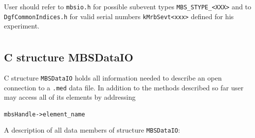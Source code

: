 \documentclass[10pt,a4paper]{article}
\newenvironment{blueboxed}
	{\begin{Sbox}\begin{minipage}[t]}
	{\end{minipage}\end{Sbox}\colorbox{lightblue}{\TheSbox}}
\begin{document}
User should refer to \verb+mbsio.h+ for possible subevent types \verb+MBS_STYPE_<XXX>+
and to \verb+DgfCommonIndices.h+ for valid serial numbers \verb+kMrbSevt<xxx>+ defined for his experiment.
\newpage
\section{\appendixname}
\subsection{C structure MBSDataIO}
C structure \verb+MBSDataIO+ holds all information needed to describe an open connection to a \verb+.med+ data file.
In addition to the methods described so far user may access all of its elements by addressing
\begin{center}
\begin{blueboxed}{.3\linewidth}
\verb+mbsHandle->element_name+
\end{blueboxed}
\end{center}
A description of all data members of structure \verb+MBSDataIO+:
\end{document}
